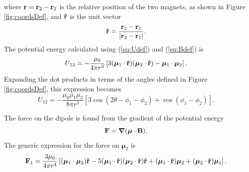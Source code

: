 \documentclass{article}
\begin{document}
where $\vb{r} =\vb{r}_2-\vb{r}_1$ is the relative position of the two magnets, as shown in Figure \ref{fig:coordsDef}, and $\vu{r}$ is the unit vector
\begin{equation}
    \vu{r}=\frac{\vb{r}_2-\vb{r}_1}{\left| \vb{r}_2-\vb{r}_1 \right|}.
\end{equation}
The potential energy calculated using (\ref{eq:Udef}) and (\ref{eq:Bdef}) is
\begin{equation}
  U_{12}=  -\frac{\mu_0}{4\pi r ^3} \left[  3(\bm{\mu}_1 \cdot \vu{r} )(\bm{\mu}_2 \cdot \vu{r}) -    \bm{\mu}_1 \cdot \bm{\mu}_2 \right]. 
  \label{eq:PE}
\end{equation}
Expanding the dot products in terms of the angles defined in Figure \ref{fig:coordsDef}, this expression becomes
\begin{equation}
    U_{12}=-\frac{\mu_0\mu_1\mu_2}{8\pi r ^3}\left[ 3\cos(2\theta -\phi_1-\phi_2) +\cos(\phi_1-\phi_2)    \right]. \label{eq:PEangles}
\end{equation}

The force on the dipole is found from the gradient of the potential energy \cite{Greene1971, Boyer1988}
\begin{equation}
    \vb{F}=\grad(    \bm{\mu}\cdot \vb{B}).
\end{equation}
The generic expression for the force on $\bm{\mu}_2$ is \cite{Yung1998}
\begin{equation}
     \vb{F}_1= \frac{3\mu_0}{4\pi r^4} \left[(    \bm{\mu}_1 \cdot     \bm{\mu}_2)\vu{r} 
     -5(    \bm{\mu}_1 \cdot \vu{r})(    \bm{\mu}_2 \cdot \vu{r}) \vu{r}+
     (    \bm{\mu}_1 \cdot \vu{r})    \bm{\mu}_2 + (    \bm{\mu}_2 \cdot \vu{r})    \bm{\mu}_1  \right]. \label{eq:FullForceDot}
\end{equation}
\end{document}
